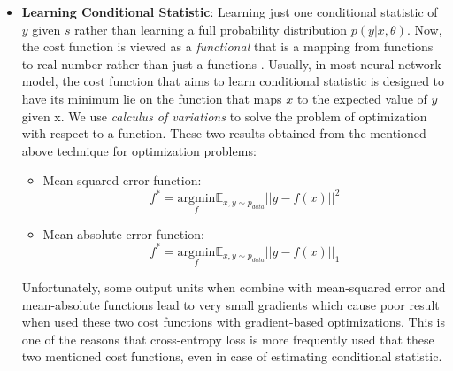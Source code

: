 \begin{itemize}
     \item \textbf{Learning Conditional Statistic}: Learning just one conditional statistic of $y$ given $s$ rather 
     than learning a full probability distribution $p(y|x,\theta )$. 
     Now, the cost function is viewed as a \textit{functional} that is a mapping from functions to real number rather than just a functions\cite{Goodfellow-et-al-2016}
     . Usually, in most neural network model, the cost function that aims to learn conditional statistic is designed to have its minimum lie on the function that maps $x$ to the expected value of $y$ given x. We use \textit{calculus of variations} to solve the problem of optimization with respect to a function\cite{Goodfellow-et-al-2016}.
      These two results obtained from the mentioned above technique for optimization problems:
     \begin{itemize}
         \item Mean-squared error function:
         \begin{equation}
             f^* = \underset{f}{\mathrm{argmin}}\mathbb{E}_{x,y\sim p_{data}}||y-f(x)||^2
         \end{equation}
         \item Mean-absolute error function:
         \begin{equation}
             f^* = \underset{f}{\mathrm{argmin}}\mathbb{E}_{x,y\sim p_{data}}||y-f(x)||_1
         \end{equation}
     \end{itemize}
     Unfortunately, some output units when combine with mean-squared error and mean-absolute functions lead to very small gradients which cause poor result when used these two cost functions with gradient-based optimizations.\cite{Goodfellow-et-al-2016} 
     This is one of the reasons that cross-entropy loss is more frequently used that these two mentioned cost functions, even in case of estimating conditional statistic. 
\end{itemize}
